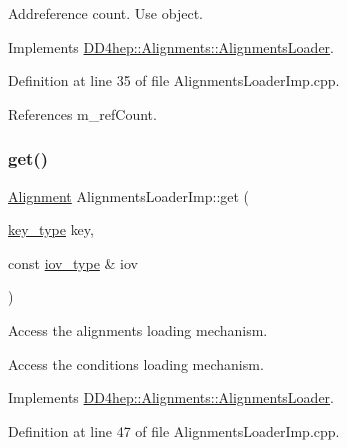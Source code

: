 Addreference count. Use object. 



Implements \hyperlink{class_d_d4hep_1_1_alignments_1_1_alignments_loader_a47a4586ac933395c27b705939985f41f}{D\+D4hep\+::\+Alignments\+::\+Alignments\+Loader}.



Definition at line 35 of file Alignments\+Loader\+Imp.\+cpp.



References m\+\_\+ref\+Count.

\hypertarget{class_d_d4hep_1_1_conditions_1_1_alignments_loader_imp_af6db86883e1ab8af6940e3260369228d}{}\label{class_d_d4hep_1_1_conditions_1_1_alignments_loader_imp_af6db86883e1ab8af6940e3260369228d} 
\subsubsection{\texorpdfstring{get()}{get()}\hspace{0.1cm}{\footnotesize\ttfamily [1/2]}}
{\footnotesize\ttfamily \hyperlink{class_d_d4hep_1_1_conditions_1_1_alignments_loader_imp_a2af19e971736ac6856523194f7eb717a}{Alignment} Alignments\+Loader\+Imp\+::get (\begin{DoxyParamCaption}\item[{\hyperlink{class_d_d4hep_1_1_alignments_1_1_alignments_loader_af56e6294e72dacbe001c1f24b8381d5d}{key\+\_\+type}}]{key,  }\item[{const \hyperlink{class_d_d4hep_1_1_alignments_1_1_alignments_loader_a632271e6cb9198528a0826d9082561d1}{iov\+\_\+type} \&}]{iov }\end{DoxyParamCaption})\hspace{0.3cm}{\ttfamily [virtual]}}



Access the alignments loading mechanism. 

Access the conditions loading mechanism. 

Implements \hyperlink{class_d_d4hep_1_1_alignments_1_1_alignments_loader_a26866df09d8670f134fc0895444f1675}{D\+D4hep\+::\+Alignments\+::\+Alignments\+Loader}.



Definition at line 47 of file Alignments\+Loader\+Imp.\+cpp.



